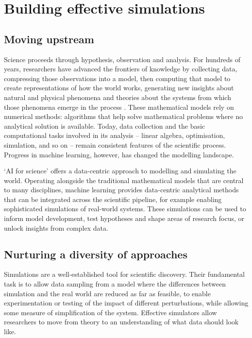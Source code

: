 \section{Building effective
simulations}\label{building-effective-simulations}

\subsection{Moving upstream}\label{moving-upstream}

Science proceeds through hypothesis, observation and analysis. For
hundreds of years, researchers have advanced the frontiers of knowledge
by collecting data, compressing those observations into a model, then
computing that model to create representations of how the world works,
generating new insights about natural and physical phenomena and
theories about the systems from which those phenomena emerge in the
process \citep{Blei-build2014}.
These mathematical models rely on numerical methods: algorithms that
help solve mathematical problems where no analytical solution is
available. Today, data collection and the basic computational tasks
involved in its analysis -- linear algebra, optimisation, simulation,
and so on -- remain consistent features of the scientific process.
Progress in machine learning, however, has changed the modelling
landscape.

`AI for science' offers a data-centric approach to modelling and
simulating the world. Operating alongside the traditional mathematical
models that are central to many disciplines, machine learning provides
data-centric analytical methods that can be integrated across the
scientific pipeline, for example enabling sophisticated simulations of
real-world systems. These simulations can be used to inform model
development, test hypotheses and shape areas of research focus, or
unlock insights from complex data.

\subsection{Nurturing a diversity of
approaches}\label{nurturing-a-diversity-of-approaches}

Simulations are a well-established tool for scientific discovery. Their
fundamental task is to allow data sampling from a model where the
differences between simulation and the real world are reduced as far as
feasible, to enable experimentation or testing of the impact of
different perturbations, while allowing some measure of simplification
of the system. Effective simulators allow researchers to move from
theory to an understanding of what data should look like.

